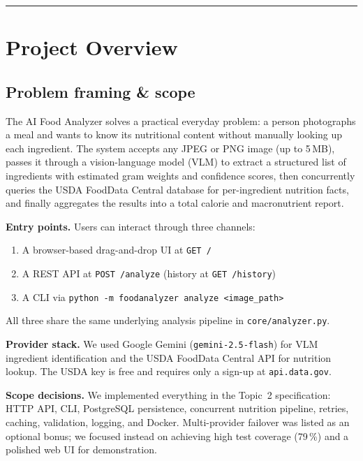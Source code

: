 \documentclass[11pt,a4paper]{article}
\begin{document}
\tableofcontents
\vspace{0.6em}\hrule\vspace{0.4em}

\section{Project Overview}

\subsection{Problem framing \& scope}

The AI Food Analyzer solves a practical everyday problem: a person photographs a meal and wants to know its nutritional content without manually looking up each ingredient.
The system accepts any JPEG or PNG image (up to 5\,MB), passes it through a vision-language model (VLM) to extract a structured list of ingredients with estimated gram weights and confidence scores, then concurrently queries the USDA FoodData Central database for per-ingredient nutrition facts, and finally aggregates the results into a total calorie and macronutrient report.

\textbf{Entry points.} Users can interact through three channels:
\begin{enumerate}[topsep=2pt,itemsep=1pt]
  \item A browser-based drag-and-drop UI at \texttt{GET /}
  \item A REST API at \texttt{POST /analyze} (history at \texttt{GET /history})
  \item A CLI via \texttt{python -m foodanalyzer analyze <image\_path>}
\end{enumerate}
All three share the same underlying analysis pipeline in \texttt{core/analyzer.py}.

\textbf{Provider stack.}
We used Google Gemini (\texttt{gemini-2.5-flash}) for VLM ingredient identification and the USDA FoodData Central API for nutrition lookup.
The USDA key is free and requires only a sign-up at \texttt{api.data.gov}.

\textbf{Scope decisions.}
We implemented everything in the Topic~2 specification: HTTP API, CLI, PostgreSQL persistence, concurrent nutrition pipeline, retries, caching, validation, logging, and Docker.
Multi-provider failover was listed as an optional bonus; we focused instead on achieving high test coverage (79\,\%) and a polished web UI for demonstration.
\end{document}
